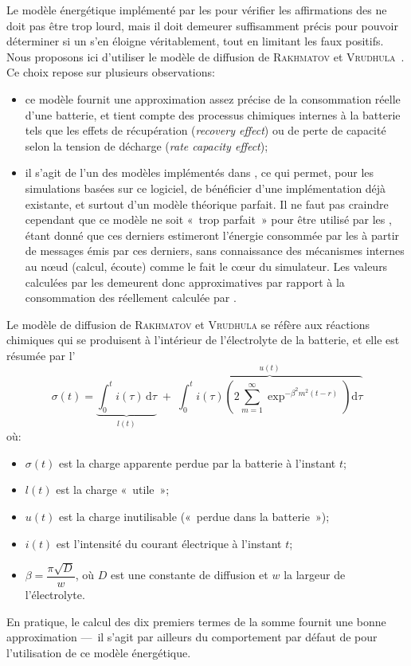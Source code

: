 Le modèle énergétique implémenté par les \vns pour vérifier les affirmations des \cns ne doit pas être trop lourd, mais il doit demeurer suffisamment précis pour pouvoir déterminer si un \cn s'en éloigne véritablement, tout en limitant les faux positifs.
Nous proposons ici d'utiliser le modèle de diffusion de \textsc{Rakhmatov} et \textsc{Vrudhula}~\cite{RV01}.\label{se:rakvru-formula}
Ce choix repose sur plusieurs observations:
\begin{itemize}
    \item ce modèle fournit une approximation assez précise de la consommation réelle d'une batterie, et tient compte des processus chimiques internes à la batterie tels que les effets de récupération (\textit{recovery effect}) ou de perte de capacité selon la tension de décharge (\textit{rate capacity effect});
    \item il s'agit de l'un des modèles implémentés dans \nsiii, ce qui permet, pour les simulations basées sur ce logiciel, de bénéficier d'une implémentation déjà existante, et surtout d'un modèle théorique parfait. Il ne faut pas craindre cependant que ce modèle ne soit « trop parfait » pour être utilisé par les \vns, étant donné que ces derniers estimeront l'énergie consommée par les \cns à partir de messages émis par ces derniers, sans connaissance des mécanismes internes au nœud (calcul, écoute) comme le fait le cœur du simulateur. Les valeurs calculées par les \vns demeurent donc approximatives par rapport à la consommation des \cns réellement calculée par \nsiii.
\end{itemize}
Le modèle de diffusion de \textsc{Rakhmatov} et \textsc{Vrudhula} se réfère aux réactions chimiques qui se produisent à l'intérieur de l'électrolyte de la batterie, et elle est résumée par l'
\begin{equation}
    \label{se:eqn:rvdm}
    \sigma(t) = \underbrace{\int_{0}^{t} i(\tau) \, \mathrm d\tau}_{l(t)} \;+\; \overbrace{\int_{0}^{t} i(\tau) \left(2 \sum_{m=1}^{\infty} \exp^{-\beta^2 m^2 (t-r)} \right) \mathrm d\tau}^{u(t)}
\end{equation}
où:
\begin{itemize}
    \item $\sigma(t)$ est la charge apparente perdue par la batterie à l'instant $t$;
    \item $l(t)$ est la charge « utile »;
    \item $u(t)$ est la charge inutilisable (« perdue dans la batterie »);
    \item $i(t)$ est l'intensité du courant électrique à l'instant $t$;
    \item $\beta = \dfrac{\pi\sqrt{D}}{w}$, où $D$ est une constante de diffusion et $w$ la largeur de l'électrolyte.
\end{itemize}
En pratique, le calcul des dix premiers termes de la somme fournit une bonne approximation ---~il s'agit par ailleurs du comportement par défaut de \nsiii pour l'utilisation de ce modèle énergétique.


